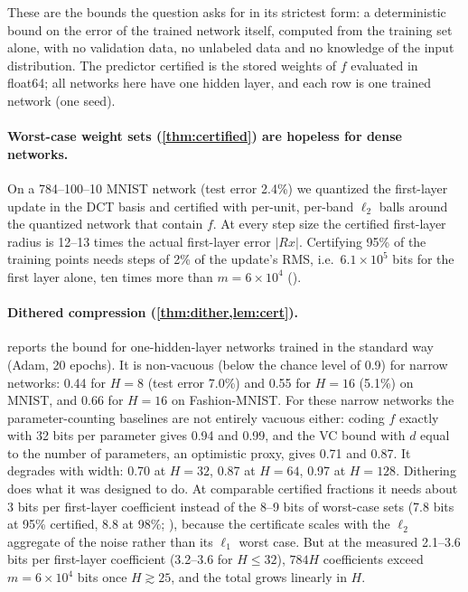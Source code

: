 These are the bounds the question asks for in its strictest form: a deterministic bound on the error of the trained network itself, computed from the training set alone, with no validation data, no unlabeled data and no knowledge of the input distribution. The predictor certified is the stored weights of $f$ evaluated in float64; all networks here have one hidden layer, and each row is one trained network (one seed).

\paragraph{Worst-case weight sets (\cref{thm:certified}) are hopeless for dense networks.} On a 784--100--10 MNIST network (test error 2.4\%) we quantized the first-layer update in the DCT basis and certified with per-unit, per-band $\ell_2$ balls around the quantized network that contain $f$. At every step size the certified first-layer radius is 12--13 times the actual first-layer error $|Rx|$. Certifying 95\% of the training points needs steps of 2\% of the update's RMS, i.e.\ $6.1\times10^5$ bits for the first layer alone, ten times more than $m=6\times10^4$ ().

\paragraph{Dithered compression (\cref{thm:dither,lem:cert}).}  reports the bound for one-hidden-layer networks trained in the standard way (Adam, 20 epochs). It is non-vacuous (below the chance level of 0.9) for narrow networks: 0.44 for $H=8$ (test error 7.0\%) and 0.55 for $H=16$ (5.1\%) on MNIST, and 0.66 for $H=16$ on Fashion-MNIST. For these narrow networks the parameter-counting baselines are not entirely vacuous either: coding $f$ exactly with 32 bits per parameter gives 0.94 and 0.99, and the VC bound with $d$ equal to the number of parameters, an optimistic proxy, gives 0.71 and 0.87. It degrades with width: 0.70 at $H=32$, 0.87 at $H=64$, 0.97 at $H=128$. Dithering does what it was designed to do. At comparable certified fractions it needs about 3 bits per first-layer coefficient instead of the 8--9 bits of worst-case sets (7.8 bits at 95\% certified, 8.8 at 98\%; ), because the certificate scales with the $\ell_2$ aggregate of the noise rather than its $\ell_1$ worst case. But at the measured 2.1--3.6 bits per first-layer coefficient (3.2--3.6 for $H\le32$), $784H$ coefficients exceed $m=6\times10^4$ bits once $H\gtrsim25$, and the total grows linearly in $H$.

